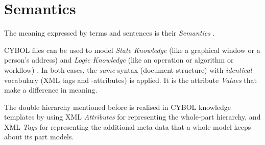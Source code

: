 %
%
%
%
%
%

\section{Semantics}
\label{semantics_heading}

The meaning expressed by terms and sentences is their \emph{Semantics}
\cite{duden}.

CYBOL files can be used to model \emph{State Knowledge} (like a graphical
window or a person's address) and \emph{Logic Knowledge} (like an operation or
algorithm or workflow) \cite{cybopbook}. In both cases, the \emph{same} syntax
(document structure) with \emph{identical} vocabulary (XML tags and -attributes)
is applied. It is the attribute \emph{Values} that make a difference in meaning.

The double hierarchy mentioned before is realised in CYBOL knowledge templates
by using XML \emph{Attributes} for representing the whole-part hierarchy, and
XML \emph{Tags} for representing the additional meta data that a whole model
keeps about its part models.




